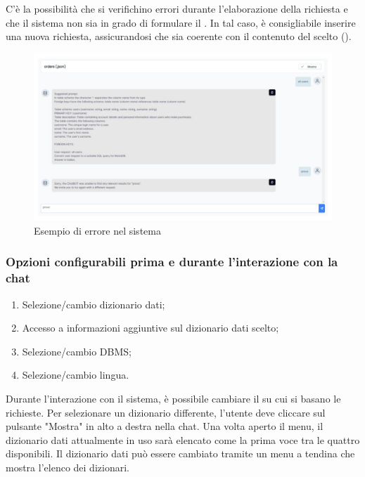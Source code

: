 \par C'è la possibilità che si verifichino errori durante l'elaborazione della richiesta e che il sistema non sia in grado di formulare il . In tal caso, è consigliabile inserire una nuova richiesta, assicurandosi che sia coerente con il contenuto del  scelto ().

\begin{figure}[H]
  \centering
  \includegraphics[width=\textwidth]{assets/es_chat_errore.png}
  \caption{Esempio di errore nel sistema}
\end{figure}

\subsubsection{Opzioni configurabili prima e durante l'interazione con la chat}

\begin{enumerate}
  \item Selezione/cambio dizionario dati;
  \item Accesso a informazioni aggiuntive sul dizionario dati scelto;
  \item Selezione/cambio DBMS;
  \item Selezione/cambio lingua.
\end{enumerate}


\par Durante l'interazione con il sistema, è possibile cambiare il  su cui si basano le richieste. Per selezionare un dizionario differente, l'utente deve cliccare sul pulsante "Mostra" in alto a destra nella chat. Una volta aperto il menu, il dizionario dati attualmente in uso sarà elencato come la prima voce tra le quattro disponibili. Il dizionario dati può essere cambiato tramite un menu a tendina che mostra l'elenco dei dizionari.

